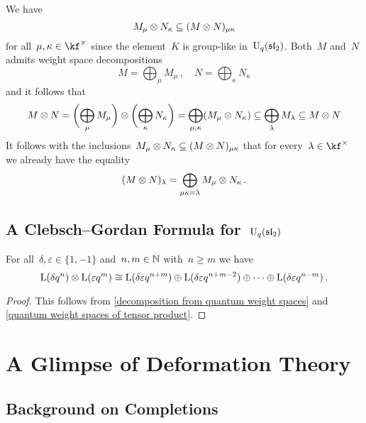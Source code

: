 \documentclass[a4paper, 11pt, oneside]{scrartcl}
\begin{document}
We have
\[
  M_\mu \otimes N_\kappa
  \subseteq
  (M \otimes N)_{\mu \kappa}
\]
for all~$\mu, \kappa \in \kf^\times$ since the element~$K$ is group-like in~$\operatorname{U}_q(\mathfrak{sl}_2)$.
Both~$M$ and~$N$ admits weight space decompositions
\[
  M = \bigoplus_\mu M_\mu \,,
  \quad
  N = \bigoplus_\kappa N_\kappa
\]
and it follows that
\[
  M \otimes N
  =
  \biggl( \bigoplus_\mu M_\mu  \biggr)
  \otimes
  \biggl( \bigoplus_\kappa N_\kappa  \biggr)
  =
  \bigoplus_{\mu, \kappa} (M_\mu \otimes N_\kappa)
  \subseteq
  \bigoplus_{\lambda} M_{\lambda}
  \subseteq
  M \otimes N
\]
It follows with the inclusions~$M_\mu \otimes N_\kappa \subseteq (M \otimes N)_{\mu \kappa}$ that for every~$\lambda \in \kf^\times$ we already have the equality
\[
  (M \otimes N)_{\lambda}
  =
  \bigoplus_{\mu \kappa = \lambda}
  M_\mu \otimes N_\kappa \,.
\]



\subsection{A Clebsch–Gordan Formula for~\texorpdfstring{$\operatorname{U}_q(\mathfrak{sl}_2)$}{Uq(sl2)}}
\label{quantum clebsch gordan}

\begin{proposition}
  For all~$\delta, \varepsilon \in \{1, -1\}$ and~$n, m \in \mathbb{N}$ with~$n \geq m$ we have
  \[
    \operatorname{L}(\delta q^n) \otimes \operatorname{L}(\varepsilon q^m)
    \cong
    \operatorname{L}(\delta \varepsilon q^{n+m})
    \oplus
    \operatorname{L}(\delta \varepsilon q^{n+m-2})
    \oplus
    \dotsb
    \oplus
    \operatorname{L}(\delta \varepsilon q^{n-m}) \,.
  \]
\end{proposition}

\begin{proof}
  This follows from \cref{decomposition from quantum weight spaces} and \cref{quantum weight spaces of tensor product}.
\end{proof}





\section{A Glimpse of Deformation Theory}
\label{deformation theory}



\subsection{Background on Completions}
\end{document}
